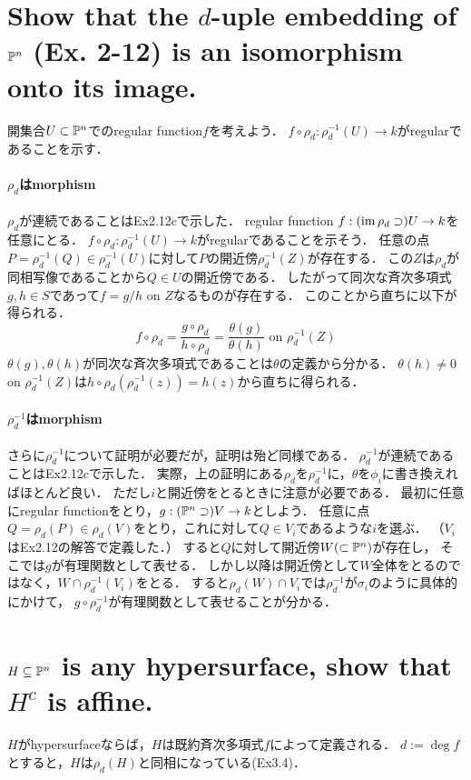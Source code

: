 \documentclass[a4paper]{jarticle}
\begin{document}
\section{Show that the $d$-uple embedding of $\mathbb{P}^n$ (Ex. 2-12) is an isomorphism onto its image.} %
    開集合$U \subset \mathbb{P}^n$でのregular function$f$を考えよう．
    $f \circ \rho_d: \rho_d^{-1}(U) \to k$がregularであることを示す．

    \paragraph{$\rho_d$はmorphism}
    $\rho_d$が連続であることはEx2.12cで示した．
    regular function $f: (\operatorname{im} \rho_d \supset) U  \to k$を任意にとる．
    $f \circ \rho_d: \rho_d^{-1}(U) \to k$がregularであることを示そう．
    任意の点$P=\rho_d^{-1}(Q) \in \rho_d^{-1}(U)$に対して$P$の開近傍$\rho_d^{-1}(Z)$が存在する．
    この$Z$は$\rho_d$が同相写像であることから$Q \in U$の開近傍である．
    したがって同次な斉次多項式$g,h \in S$であって$f=g/h \mbox{ on } Z$なるものが存在する．
    このことから直ちに以下が得られる．
    \[ f \circ \rho_d=\frac{g \circ \rho_d}{h \circ \rho_d}=\frac{\theta(g)}{\theta(h)} \mbox{ on } \rho_d^{-1}(Z) \]
    $\theta(g), \theta(h)$が同次な斉次多項式であることは$\theta$の定義から分かる．
    $\theta(h) \neq 0$ on $\rho_d^{-1}(Z)$は$h \circ \rho_d(\rho_d^{-1}(z))=h(z)$から直ちに得られる．

    \paragraph{$\rho_d^{-1}$はmorphism}
    さらに$\rho_d^{-1}$について証明が必要だが，証明は殆ど同様である．
    $\rho_d^{-1}$が連続であることはEx2.12cで示した．
    実際，上の証明にある$\rho_d$を$\rho_d^{-1}$に，$\theta$を$\phi_i$に書き換えればほとんど良い．
    ただし$i$と開近傍をとるときに注意が必要である．
    最初に任意にregular functionをとり，$g: (\mathbb{P}^n \supset) V \to k$としよう．
    任意に点$Q=\rho_d(P) \in \rho_d(V)$をとり，これに対して$Q \in V_i$であるような$i$を選ぶ．
    （$V_i$はEx2.12の解答で定義した．）
    すると$Q$に対して開近傍$W( \subset \mathbb{P}^n)$が存在し，
    そこでは$g$が有理関数として表せる．
    しかし以降は開近傍として$W$全体をとるのではなく，$W \cap \rho_d^{-1}(V_i)$をとる．
    すると$\rho_d(W) \cap V_i$では$\rho_d^{-1}$が$\sigma_i$のように具体的にかけて，
    $g \circ \rho_d^{-1}$が有理関数として表せることが分かる．

\section{$H \subseteq \mathbb{P}^n$ is any hypersurface, show that $H^c$ is affine.} %
    $H$がhypersurfaceならば，$H$は既約斉次多項式$f$によって定義される．
    $d:=\deg f$とすると，$H$は$\rho_d(H)$と同相になっている(Ex3.4)．
\end{document}
